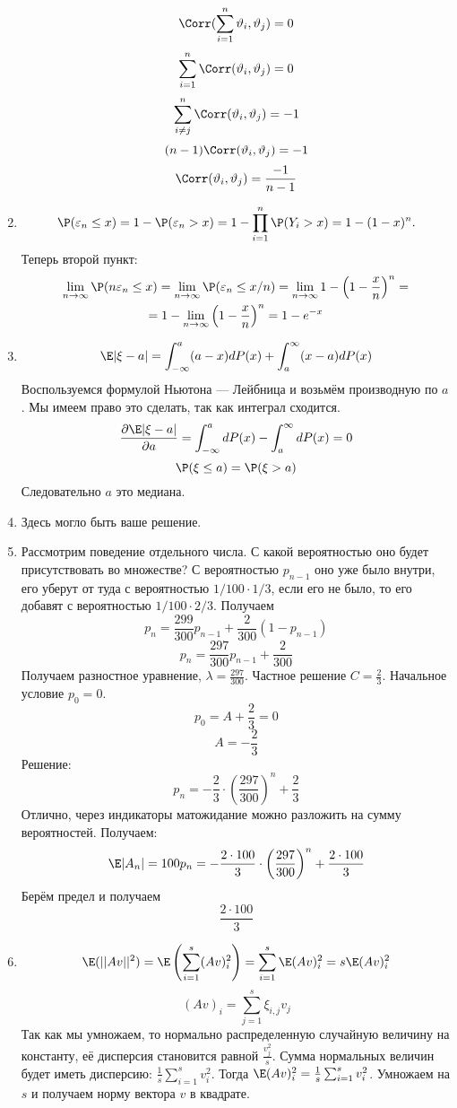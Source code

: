 \begin{enumerate}
\[
\Corr (\sum_{i = 1}^n \vartheta_i, \vartheta_j) = 0
\]
\[
\sum_{i = 1}^n \Corr (\vartheta_i, \vartheta_j) = 0
\]
\[
\sum_{i \neq j}^n \Corr (\vartheta_i, \vartheta_j) = -1
\]
\[
(n-1)  \Corr (\vartheta_i, \vartheta_j) = -1
\]
\[
 \Corr (\vartheta_i, \vartheta_j) = \frac{-1}{n-1}
\]
\item \[
\P (\varepsilon_n \leq x) = 1 - \P (\varepsilon_n > x) = 1 - \prod_{i = 1}^n  \P (Y_i > x) = 1 - (1 - x)^n.
\]
Теперь второй пункт:
\begin{multline*}
\lim_{n \rightarrow \infty} \P (n\varepsilon_n \leq x) = \lim_{n \rightarrow \infty} \P (\varepsilon_n \leq x/n) =  \lim_{n \rightarrow \infty} 1 - \left(1 - \frac{x}{n}\right)^n = \\
= 1 - \lim_{n \rightarrow \infty} \left(1 - \frac{x}{n}\right)^n = 1 - e^{-x}
\end{multline*}
\item \[
\E |\xi - a| = \int_{-\infty}^a (a - x) dP(x) +  \int_{a}^{\infty} (x- a) dP(x)
\]
Воспользуемся формулой Ньютона — Лейбница и возьмём производную по $a$. Мы имеем право это сделать, так как интеграл сходится.
\[
\frac{\partial \E|\xi - a|}{\partial a} = \int_{-\infty}^a dP(x) - \int_{a}^{\infty} dP(x) = 0
\]
\[
\P(\xi \leq a) = \P(\xi > a)
\]
Следовательно $a$ это медиана.
\item Здесь могло быть ваше решение.

\item Рассмотрим поведение отдельного числа. С какой вероятностью оно будет присутствовать во множестве? С вероятностью $p_{n-1}$ оно уже было внутри, его уберут от туда с вероятностью $1/100 \cdot 1/3$, если его не было, то его добавят с вероятностью $1/100 \cdot 2/3$. Получаем
\[
p_n = \frac{299}{300}p_{n - 1} + \frac{2}{300}(1 - p_{n-1})
\]
\[
p_n = \frac{297}{300}p_{n - 1} +  \frac{2}{300}
\]
Получаем разностное уравнение, $\lambda = \frac{297}{300}$. Частное решение $C = \frac{2}{3}$. Начальное условие $p_0 = 0$.
\[
p_0 = A + \frac{2}{3} = 0
\]
\[
A = -\frac{2}{3}
\]
Решение:
\[
p_n = -\frac{2}{3} \cdot \left( \frac{297}{300} \right)^n + \frac{2}{3}
\]
Отлично, через индикаторы матожидание можно разложить на сумму вероятностей. Получаем:
\[
\E |A_n| = 100 p_n = -\frac{2 \cdot 100}{3} \cdot \left( \frac{297}{300} \right)^n + \frac{2 \cdot 100}{3}
\]
Берём предел и получаем
\[
\frac{2 \cdot 100}{3}
\]

\item \[
\E(||Av||^2) = \E \left(\sum_{i = 1}^s (Av)^2_{i} \right) = \sum_{i = 1}^s \E (Av)^2_{i}  = s \E (Av)^2_{i}
\]
\[
(Av)_i = \sum_{j= 1}^s \xi_{i, j} v_j
\]
Так как мы умножаем, то нормально распределенную случайную величину на константу, её дисперсия становится равной $\frac{v_j^2}{s}$. Сумма нормальных величин будет иметь дисперсию: $\frac{1}{s}\sum_{i = 1}^s v_i^2$. Тогда $\E (Av)^2_{i} = \frac{1}{s}\sum_{i = 1}^s v_i^2$. Умножаем на $s$ и получаем норму вектора $v$ в квадрате.


\end{enumerate}



